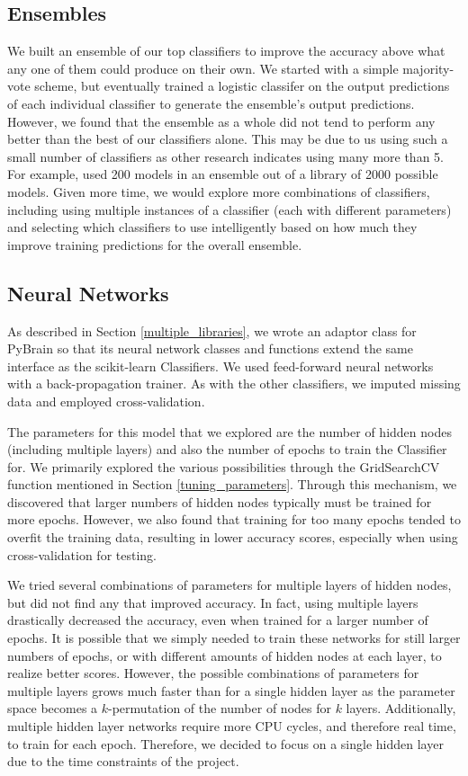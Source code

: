 \documentclass{article}
\begin{document}
\subsection{Ensembles}

We built an ensemble of our top classifiers to improve the accuracy above what any one of them could produce on their own.
We started with a simple majority-vote scheme, but eventually trained a logistic classifer on the output predictions of each individual classifier to generate the ensemble's output predictions.
However, we found that the ensemble as a whole did not tend to perform any better than the best of our classifiers alone.
This may be due to us using such a small number of classifiers as other research indicates using many more than 5.
For example, \cite{caruana2004ensemble} used 200 models in an ensemble out of a library of 2000 possible models.
Given more time, we would explore more combinations of classifiers, including using multiple instances of a classifier (each with different parameters) and selecting which classifiers to use intelligently based on how much they improve training predictions for the overall ensemble.

\subsection{Neural Networks}

As described in Section \ref{multiple_libraries}, we wrote an adaptor class for PyBrain so that its neural network classes and functions extend the same interface as the scikit-learn Classifiers.
We used feed-forward neural networks with a back-propagation trainer.
As with the other classifiers, we imputed missing data and employed cross-validation.

The parameters for this model that we explored are the number of hidden nodes (including multiple layers) and also the number of epochs to train the Classifier for.
We primarily explored the various possibilities through the GridSearchCV function mentioned in Section \ref{tuning_parameters}.
Through this mechanism, we discovered that larger numbers of hidden nodes typically must be trained for more epochs.
However, we also found that training for too many epochs tended to overfit the training data, resulting in lower accuracy scores, especially when using cross-validation for testing.

We tried several combinations of parameters for multiple layers of hidden nodes, but did not find any that improved accuracy.
In fact, using multiple layers drastically decreased the accuracy, even when trained for a larger number of epochs.
It is possible that we simply needed to train these networks for still larger numbers of epochs, or with different amounts of hidden nodes at each layer, to realize better scores.
However, the possible combinations of parameters for multiple layers grows much faster than for a single hidden layer as the parameter space becomes a $k$-permutation of the number of nodes for $k$ layers.
Additionally, multiple hidden layer networks require more CPU cycles, and therefore real time, to train for each epoch.
Therefore, we decided to focus on a single hidden layer due to the time constraints of the project.
\end{document}
